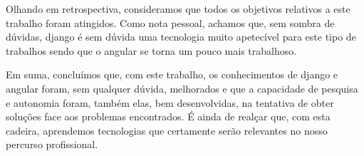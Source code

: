 \documentclass[12pt]{article}
\begin{document}
\vspace{8mm}

Olhando em retrospectiva, consideramos que todos os objetivos relativos a este trabalho foram atingidos. Como nota pessoal, achamos que, sem sombra de dúvidas, django é sem dúvida uma tecnologia muito apetecível para este tipo de trabalhos sendo que o angular se torna um pouco mais trabalhoso.
\par Em suma, concluímos que, com este trabalho, os conhecimentos de django e angular foram, sem qualquer dúvida, melhorados e que a capacidade de pesquisa e autonomia foram, também elas, bem desenvolvidas, na tentativa de obter soluções face aos problemas encontrados. É ainda de realçar que, com esta cadeira, aprendemos tecnologias que certamente serão relevantes no nosso percurso profissional.
\end{document}
